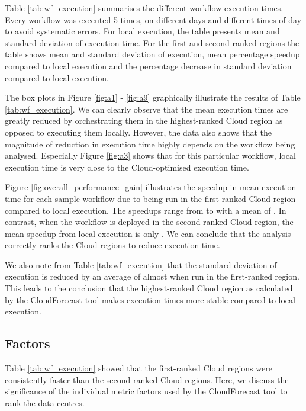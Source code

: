 \documentclass[10pt, conference, compsocconf]{IEEEtran}
\newcommand{\sysname}{CloudForecast\xspace}
\begin{document}
Table \ref{tab:wf_execution} summarises the different workflow execution times. Every workflow was executed 5 times, on different days and different times of day to avoid systematic errors. For local execution, the table presents mean and standard deviation of execution time. For the first and second-ranked regions the table shows mean and standard deviation of execution, mean percentage speedup compared to local execution and the percentage decrease in standard deviation compared to local execution.

The box plots in Figure \ref{fig:a1} - \ref{fig:a9} graphically illustrate the results of Table \ref{tab:wf_execution}. We can clearly observe that the mean execution times are greatly reduced by orchestrating them in the highest-ranked Cloud region as opposed to executing them locally. However, the data also shows that the magnitude of reduction in execution time highly depends on the workflow being analysed. Especially Figure \ref{fig:a3} shows that for this particular workflow, local execution time is very close to the Cloud-optimised execution time.

Figure \ref{fig:overall_performance_gain} illustrates the speedup in mean execution time for each sample workflow due to being run in the first-ranked Cloud region compared to local execution. The speedups range from  to  with a mean of . In contrast, when the workflow is deployed in the second-ranked Cloud region, the mean speedup from local execution is only . We can conclude that the analysis correctly ranks the Cloud regions to reduce execution time.

We also note from Table \ref{tab:wf_execution} that the standard deviation of execution is reduced by an average of almost  when run in the first-ranked region. This leads to the conclusion that the highest-ranked Cloud region as calculated by the \sysname tool makes execution times more stable compared to local execution.






\subsection{Factors}

Table \ref{tab:wf_execution} showed that the first-ranked Cloud regions were consistently faster than the second-ranked Cloud regions. Here, we discuss the significance of the individual metric factors used by the \sysname tool to rank the data centres.
\end{document}
